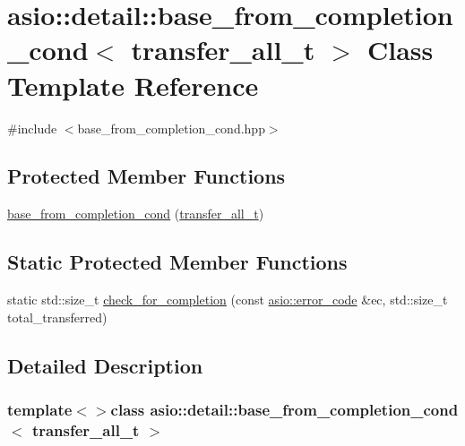 \hypertarget{classasio_1_1detail_1_1base__from__completion__cond_3_01transfer__all__t_01_4}{}\section{asio\+:\+:detail\+:\+:base\+\_\+from\+\_\+completion\+\_\+cond$<$ transfer\+\_\+all\+\_\+t $>$ Class Template Reference}
\label{classasio_1_1detail_1_1base__from__completion__cond_3_01transfer__all__t_01_4}


{\ttfamily \#include $<$base\+\_\+from\+\_\+completion\+\_\+cond.\+hpp$>$}

\subsection*{Protected Member Functions}
\begin{DoxyCompactItemize}
\item 
\hyperlink{classasio_1_1detail_1_1base__from__completion__cond_3_01transfer__all__t_01_4_af33c4c5ca9fe207c626a2f84640fdc42}{base\+\_\+from\+\_\+completion\+\_\+cond} (\hyperlink{classasio_1_1detail_1_1transfer__all__t}{transfer\+\_\+all\+\_\+t})
\end{DoxyCompactItemize}
\subsection*{Static Protected Member Functions}
\begin{DoxyCompactItemize}
\item 
static std\+::size\+\_\+t \hyperlink{classasio_1_1detail_1_1base__from__completion__cond_3_01transfer__all__t_01_4_a8c3306c674c2ff746123ed3c0fe3d93c}{check\+\_\+for\+\_\+completion} (const \hyperlink{classasio_1_1error__code}{asio\+::error\+\_\+code} \&ec, std\+::size\+\_\+t total\+\_\+transferred)
\end{DoxyCompactItemize}


\subsection{Detailed Description}
\subsubsection*{template$<$$>$class asio\+::detail\+::base\+\_\+from\+\_\+completion\+\_\+cond$<$ transfer\+\_\+all\+\_\+t $>$}



